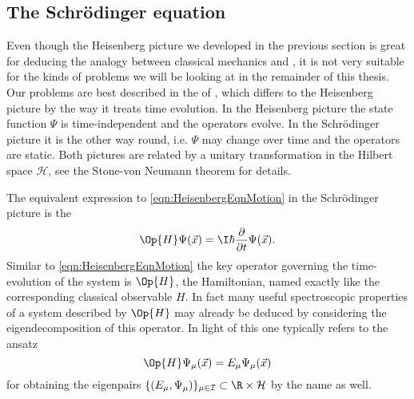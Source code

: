 \subsection{The Schrödinger equation}
Even though the Heisenberg picture we developed
in the previous section is great for deducing the analogy between
classical mechanics and \QM,
it is not very suitable for the kinds of problems we will be looking
at in the remainder of this thesis.
Our problems are best described in the  of \QM,
which differs to the Heisenberg picture by the way it treats time evolution.
In the Heisenberg picture the state function $\Psi$ is time-independent
and the operators evolve.
In the Schrödinger picture it is the other way round, i.e. $\Psi$ may change over time
and the operators are static.
Both pictures are related by a unitary transformation
in the Hilbert space $\mathcal{H}$,
see the Stone-von Neumann theorem for details.

The equivalent expression to \eqref{eqn:HeisenbergEqnMotion}
in the Schrödinger picture is the 
\begin{equation}
	\Op{H} \Psi(\vec{x}) = \I \hbar \frac{\partial}{\partial t} \Psi(\vec{x}).
	\label{eqn:TDSE}
\end{equation}
Similar to \eqref{eqn:HeisenbergEqnMotion} the key operator governing the
time-evolution of the system is $\Op{H}$, the \QM Hamiltonian,
named exactly like the corresponding classical observable $H$.
In fact many useful spectroscopic properties of a system described by $\Op{H}$
may already be deduced by considering the eigendecomposition of this operator.
In light of this one typically refers to the ansatz
\begin{equation}
	\Op{H} \Psi_\mu(\vec{x}) = E_\mu \Psi_\mu(\vec{x})
	\label{eqn:TISE}
\end{equation}
for obtaining the eigenpairs
$\{(E_\mu, \Psi_\mu) \}_{\mu \in \mathcal{I}} \subset \R \times \mathcal{H}$
by the name  as well.

